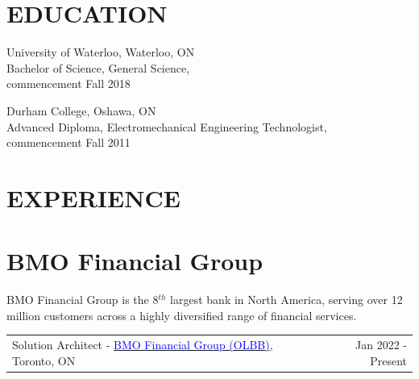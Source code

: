 \documentclass[margin]{res}
\begin{document}
\begin{resume}
	\section{\textcolor{NavyBlue}{EDUCATION}}

	University of Waterloo, Waterloo, ON \\
	Bachelor of Science, General Science, \\
	commencement Fall 2018

	Durham College, Oshawa, ON \\
	Advanced Diploma, Electromechanical Engineering Technologist, \\
	commencement Fall 2011


	\section{\textcolor{NavyBlue}{EXPERIENCE}}

	\normalsize{\section{BMO Financial Group}}

	BMO Financial Group is the 8\begin{math}^{th}\end{math} largest bank in North America,
	serving over 12 million customers across a highly diversified range of financial services.

	\begin{tabular}{p{3in} r} %
		Solution Architect - \href{https://bmo.com}{\textcolor{blue}{BMO Financial Group (OLBB)}}, Toronto, ON & Jan 2022 - Present
	\end{tabular}


\end{resume}
\end{document}
